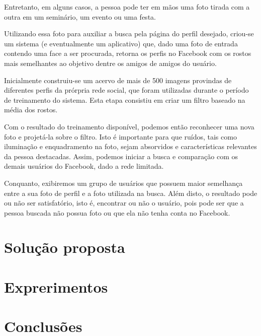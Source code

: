 \documentclass[10pt,a4paper]{article}
\begin{document}
	Entretanto, em alguns casos, a pessoa pode ter em mãos uma foto tirada com a outra em um seminário, um evento ou uma festa.

	Utilizando essa foto para auxiliar a busca pela página do perfil desejado, criou-se um sistema (e eventualmente um aplicativo) que, dado uma foto de entrada contendo uma face a ser procurada, retorna os perfis no Facebook com os rostos mais semelhantes ao objetivo dentre os amigos de amigos do usuário.

	Inicialmente construiu-se um acervo de mais de 500 imagens provindas de diferentes perfis da prórpria rede social, que foram utilizadas durante o período de treinamento do sistema. Esta etapa consistiu em criar um filtro baseado na média dos rostos.

	Com o resultado do treinamento disponível, podemos então reconhecer uma nova foto e projetá-la sobre o filtro. Isto é importante para que ruídos, tais como iluminação e enquadramento na foto, sejam absorvidos e características relevantes da pessoa destacadas. Assim, podemos iniciar a busca e comparação com os demais usuários do Facebook, dado a rede limitada.

	Conquanto, exibiremos um grupo de usuários que possuem maior semelhança entre a sua foto de perfil e a foto utilizada na busca. Além disto, o resultado pode ou não ser satisfatório, isto é, encontrar ou não o usuário, pois pode ser que a pessoa buscada não possua foto ou que ela não tenha conta no Facebook.

\section{Solução proposta}

\section{Exprerimentos}

\section{Conclusões}


\begin{small}
  
\end{small}
\end{document}
